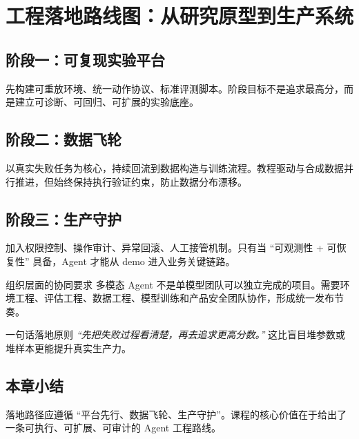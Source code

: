 \section{工程落地路线图：从研究原型到生产系统}

\subsection{阶段一：可复现实验平台}
先构建可重放环境、统一动作协议、标准评测脚本。阶段目标不是追求最高分，而是建立可诊断、可回归、可扩展的实验底座。

\subsection{阶段二：数据飞轮}
以真实失败任务为核心，持续回流到数据构造与训练流程。教程驱动与合成数据并行推进，但始终保持执行验证约束，防止数据分布漂移。

\subsection{阶段三：生产守护}
加入权限控制、操作审计、异常回滚、人工接管机制。只有当 ``可观测性 + 可恢复性'' 具备，Agent 才能从 demo 进入业务关键链路。

\begin{knowledgebox}{组织层面的协同要求}
多模态 Agent 不是单模型团队可以独立完成的项目。需要环境工程、评估工程、数据工程、模型训练和产品安全团队协作，形成统一发布节奏。
\end{knowledgebox}

\begin{importantbox}{一句话落地原则}
\textit{``先把失败过程看清楚，再去追求更高分数。''} 这比盲目堆参数或堆样本更能提升真实生产力。
\end{importantbox}

\subsection{本章小结}
落地路径应遵循 ``平台先行、数据飞轮、生产守护''。课程的核心价值在于给出了一条可执行、可扩展、可审计的 Agent 工程路线。

